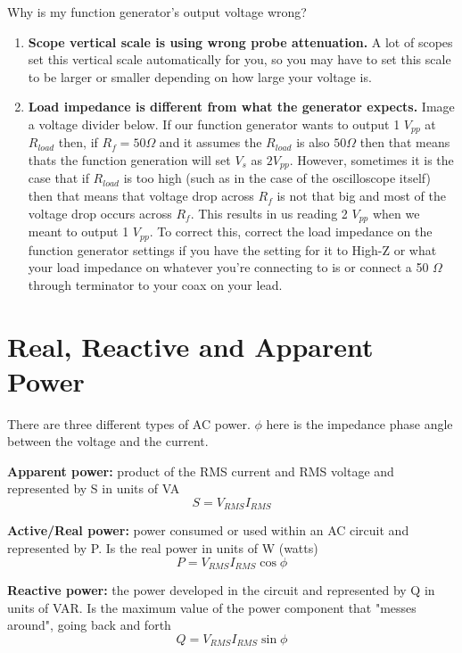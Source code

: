 Why is my function generator's output voltage wrong?
\begin{enumerate}
    \item \textbf{Scope vertical scale is using wrong probe attenuation.} A lot of scopes set this vertical scale automatically for you, so you may have to set this scale to be larger or smaller depending on how large your voltage is.
    \item \textbf{Load impedance is different from what the generator expects.} Image a voltage divider below. If our function generator wants to output 1 $V_{pp}$ at $R_{load}$ then, if $R_f = 50 \Omega$ and it assumes the $R_{load}$ is also $50 \Omega$ then that means thats the function generation will set $V_s$ as $2 V_{pp}$. However, sometimes it is the case that if $R_{load}$ is too high (such as in the case of the oscilloscope itself) then that means that voltage drop across $R_f$ is not that big and most of the voltage drop occurs across $R_f$. This results in us reading 2 $V_{pp}$ when we meant to output 1 $V_{pp}$. To correct this, correct the load impedance on the function generator settings if you have the setting for it to High-Z or what your load impedance on whatever you're connecting to is or connect a 50 $\Omega$ through terminator to your coax on your lead.
    
    
\end{enumerate}

\section{Real, Reactive and Apparent Power}
There are three different types of AC power. $\phi$ here is the impedance phase angle between the voltage and the current.
\begin{pline}
    \item \textbf{Apparent power:} product of the RMS current and RMS voltage and represented by S in units of VA
        \[S = V_{RMS} I_{RMS}\]
    \item \textbf{Active/Real power:} power consumed or used within an AC circuit and represented by P. Is the real power in units of W (watts)
        \[P = V_{RMS} I_{RMS} \cos{\phi}\]
    \item \textbf{Reactive power:} the power developed in the circuit and represented by Q in units of VAR. Is the maximum value of the power component that "messes around", going back and forth
        \[Q = V_{RMS} I_{RMS} \sin{\phi}\]
\end{pline}

